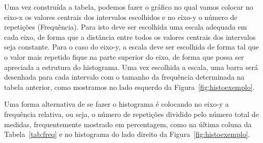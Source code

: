 Uma vez construída a tabela, podemos fazer o gráfico no qual vamos colocar no eixo-x os valores centrais dos intervalos escolhidos e no eixo-y o número de repetições (Frequência). Para isto deve ser escolhida uma escala adequada em cada eixo, de forma que a distância entre todos os valores centrais dos intervalos seja constante.  Para o caso do eixo-y, a escala deve ser escolhida de forma tal que o valor mais repetido fique na parte superior do eixo, de forma que possa ser apreciada a estrutura do histograma. Uma vez escolhida a escala, uma barra será desenhada para cada intervalo com o tamanho da frequência determinada na tabela anterior, como mostramos no lado esquerdo da Figura~\ref{fig:histoexemplo}.

Uma forma alternativa de se fazer o histograma é colocando no eixo-y a frequência relativa, ou seja, o número de repetições dividido pelo número total de medidas, frequentemente mostrado em percentagem, como na última coluna da Tabela~\ref{tab:freq} e no histograma do lado direito da Figura~\ref{fig:histoexemplo}. 

